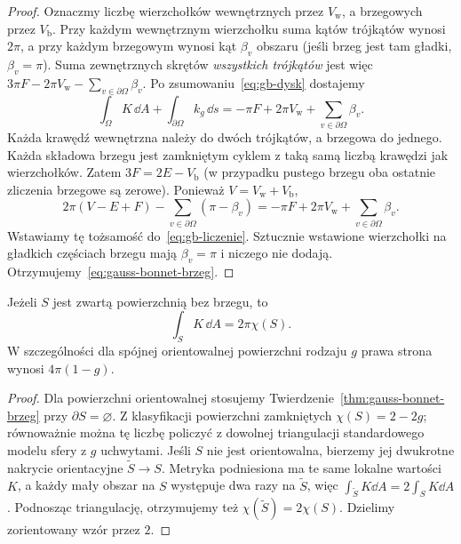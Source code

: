 \begin{proof}
Oznaczmy liczbę wierzchołków wewnętrznych przez
$V_{\mathrm w}$, a brzegowych przez $V_{\mathrm b}$.
Przy każdym wewnętrznym wierzchołku suma kątów
trójkątów wynosi $2\pi$, a przy każdym brzegowym
wynosi kąt $\beta_v$ obszaru (jeśli brzeg jest tam
gładki, $\beta_v=\pi$). Suma zewnętrznych skrętów
\emph{wszystkich trójkątów} jest więc
$3\pi F-2\pi V_{\mathrm w}-\sum_{v\in\partial\Omega}\beta_v$.
Po zsumowaniu~\eqref{eq:gb-dysk} dostajemy
\begin{equation}\label{eq:gb-liczenie}
 \int_\Omega K\,\dd A
 +\int_{\partial\Omega}k_g\,\dd s
 =-\pi F+2\pi V_{\mathrm w}
                 +\sum_{v\in\partial\Omega}\beta_v.
\end{equation}
Każda krawędź wewnętrzna należy do dwóch trójkątów,
a brzegowa do jednego. Każda składowa brzegu jest
zamkniętym cyklem z taką samą liczbą krawędzi jak
wierzchołków. Zatem
$3F=2E-V_{\mathrm b}$ (w przypadku pustego brzegu
oba ostatnie zliczenia brzegowe są zerowe).
Ponieważ $V=V_{\mathrm w}+V_{\mathrm b}$,
\[
 2\pi(V-E+F)
 -\sum_{v\in\partial\Omega}(\pi-\beta_v)
 =-\pi F+2\pi V_{\mathrm w}
                  +\sum_{v\in\partial\Omega}\beta_v.
\]
Wstawiamy tę tożsamość do~\eqref{eq:gb-liczenie}.
Sztucznie wstawione wierzchołki na gładkich częściach
brzegu mają $\beta_v=\pi$ i niczego nie dodają.
Otrzymujemy~\eqref{eq:gauss-bonnet-brzeg}.
\end{proof}

\begin{wniosek}
\label{cor:gauss-bonnet-zamknieta}
Jeżeli $S$ jest zwartą powierzchnią bez brzegu, to
\begin{equation}\label{eq:gb-zamknieta}
 \boxed{\displaystyle\int_S K\,\dd A=2\pi\chi(S).}
\end{equation}
W szczególności dla spójnej orientowalnej powierzchni
rodzaju $g$ prawa strona wynosi $4\pi(1-g)$.
\end{wniosek}
\begin{proof}
Dla powierzchni orientowalnej stosujemy
Twierdzenie~\ref{thm:gauss-bonnet-brzeg} przy
$\partial S=\varnothing$. Z klasyfikacji powierzchni
zamkniętych $\chi(S)=2-2g$; równoważnie można tę
liczbę policzyć z dowolnej triangulacji standardowego
modelu sfery z $g$ uchwytami. Jeśli $S$ nie jest
orientowalna, bierzemy jej dwukrotne nakrycie
orientacyjne $\widetilde S\to S$. Metryka podniesiona
ma te same lokalne wartości $K$, a każdy mały obszar
na $S$ występuje dwa razy na $\widetilde S$, więc
$\int_{\widetilde S}K\dd A=2\int_SK\dd A$.
Podnosząc triangulację, otrzymujemy też
$\chi(\widetilde S)=2\chi(S)$. Dzielimy zorientowany
wzór przez $2$.
\end{proof}

